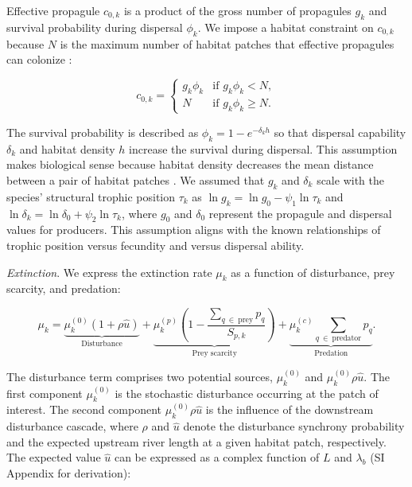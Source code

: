 \documentclass[11pt, class=article, crop=false]{standalone}
\begin{document}
Effective propagule $c_{0,k}$ is a product of the gross number of propagules $g_k$ and survival probability during dispersal $\phi_k$.
We impose a habitat constraint on $c_{0,k}$ because $N$ is the maximum number of habitat patches that effective propagules can colonize \citep{takimoto_effects_2012, terui_spatial_2019}:

\begin{equation}
    c_{0, k} = 
    \begin{cases}
        g_k \phi_k & \text{if $g_k \phi_k < N$},\\
        N & \text{if $g_k \phi_k \ge N$}.
    \end{cases}
    \label{eq:c0-prod}
\end{equation}

The survival probability is described as $\phi_k = 1 - e^{-\delta_k h}$ so that dispersal capability $\delta_k$ and habitat density $h$ increase the survival during dispersal.
This assumption makes biological sense because habitat density decreases the mean distance between a pair of habitat patches \citep{terui_spatial_2019}.
We assumed that $g_k$ and $\delta_k$ scale with the species' structural trophic position $\tau_k$ as $\ln g_k = \ln g_0 - \psi_1 \ln \tau_k$ and $\ln \delta_k = \ln \delta_0 + \psi_2 \ln \tau_k$, where $g_0$ and $\delta_0$ represent the propagule and dispersal values for producers.
This assumption aligns with the known relationships of trophic position versus fecundity and versus dispersal ability.

\textit{Extinction}. We express the extinction rate $\mu_k$ as a function of disturbance, prey scarcity, and predation:

\begin{equation}
    \mu_{k} = 
        \underbrace{\mu_{k}^{(0)} (1 + \rho \hat{u})}_{\text{Disturbance}} + 
        \underbrace{\mu_{k}^{(p)} \left(1 - \frac{\sum_{q~\in~\text{prey}} p_{q}}{S_{p, k}} \right)}_{\text{Prey scarcity}} + 
        \underbrace{\mu_{k}^{(c)} \sum_{q~\in~\text{predator}} p_{q}}_{\text{Predation}}.
    \label{eq:extn}    
\end{equation}

The disturbance term comprises two potential sources, $\mu^{(0)}_k$ and $\mu^{(0)}_k \rho \hat{u}$.
The first component $\mu^{(0)}_k$ is the stochastic disturbance occurring at the patch of interest.
The second component $\mu^{(0)}_k \rho \hat{u}$ is the influence of the downstream disturbance cascade, where $\rho$ and $\hat{u}$ denote the disturbance synchrony probability and the expected upstream river length at a given habitat patch, respectively.
The expected value $\hat{u}$ can be expressed as a complex function of $L$ and $\lambda_b$ (SI Appendix for derivation):
\end{document}
